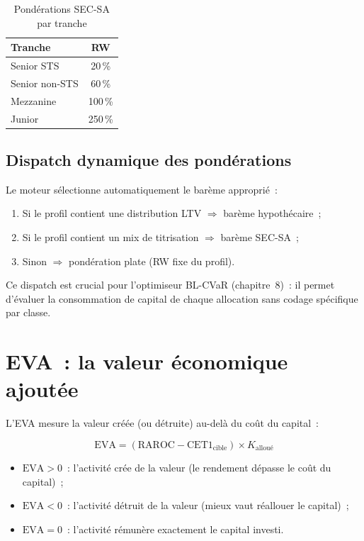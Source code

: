 \documentclass[12pt, a4paper, twoside, openright]{report}
\theoremstyle{definition}
\begin{document}
\begin{table}[htbp]
\centering
\caption{Pondérations SEC-SA par tranche}
\label{tab:rw-sec}
\begin{tabular}{lc}
\toprule
Tranche & RW \\
\midrule
Senior STS & 20\,\% \\
Senior non-STS & 60\,\% \\
Mezzanine & 100\,\% \\
Junior & 250\,\% \\
\bottomrule
\end{tabular}
\end{table}

\subsection{Dispatch dynamique des pondérations}

Le moteur sélectionne automatiquement le barème approprié~:
\begin{enumerate}[nosep]
  \item Si le profil contient une distribution LTV $\Rightarrow$ barème hypothécaire~;
  \item Si le profil contient un mix de titrisation $\Rightarrow$ barème SEC-SA~;
  \item Sinon $\Rightarrow$ pondération plate (RW fixe du profil).
\end{enumerate}

Ce dispatch est crucial pour l'optimiseur BL-CVaR (chapitre~8)~: il permet d'évaluer la consommation de capital de chaque allocation sans codage spécifique par classe.

\section{EVA~: la valeur économique ajoutée}
\label{sec:metriques:eva}

L'EVA mesure la valeur créée (ou détruite) au-delà du coût du capital~:

\begin{equation}
\text{EVA} = (\text{RAROC} - \text{CET1}_{\text{cible}}) \times K_{\text{alloué}}
\label{eq:eva}
\end{equation}

\begin{itemize}[nosep]
  \item $\text{EVA} > 0$~: l'activité crée de la valeur (le rendement dépasse le coût du capital)~;
  \item $\text{EVA} < 0$~: l'activité détruit de la valeur (mieux vaut réallouer le capital)~;
  \item $\text{EVA} = 0$~: l'activité rémunère exactement le capital investi.
\end{itemize}
\end{document}
